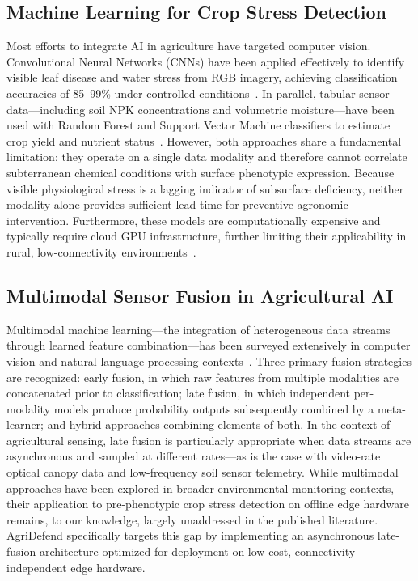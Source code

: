 \documentclass[10pt,twocolumn]{article}
\begin{document}
\subsection{Machine Learning for Crop Stress Detection}
Most efforts to integrate AI in agriculture have targeted computer vision.
Convolutional Neural Networks (CNNs) have been applied effectively to identify visible leaf disease and water stress from RGB imagery, achieving classification accuracies of 85--99\% under controlled conditions~\cite{ref14,ref9}.
In parallel, tabular sensor data---including soil NPK concentrations and volumetric moisture---have been used with Random Forest and Support Vector Machine classifiers to estimate crop yield and nutrient status~\cite{ref10}.
However, both approaches share a fundamental limitation: they operate on a single data modality and therefore cannot correlate subterranean chemical conditions with surface phenotypic expression.
Because visible physiological stress is a lagging indicator of subsurface deficiency, neither modality alone provides sufficient lead time for preventive agronomic intervention.
Furthermore, these models are computationally expensive and typically require cloud GPU infrastructure, further limiting their applicability in rural, low-connectivity environments~\cite{ref13}.

\subsection{Multimodal Sensor Fusion in Agricultural AI}
Multimodal machine learning---the integration of heterogeneous data streams through learned feature combination---has been surveyed extensively in computer vision and natural language processing contexts~\cite{ref2}.
Three primary fusion strategies are recognized: early fusion, in which raw features from multiple modalities are concatenated prior to classification; late fusion, in which independent per-modality models produce probability outputs subsequently combined by a meta-learner; and hybrid approaches combining elements of both.
In the context of agricultural sensing, late fusion is particularly appropriate when data streams are asynchronous and sampled at different rates---as is the case with video-rate optical canopy data and low-frequency soil sensor telemetry.
While multimodal approaches have been explored in broader environmental monitoring contexts, their application to pre-phenotypic crop stress detection on offline edge hardware remains, to our knowledge, largely unaddressed in the published literature.
AgriDefend specifically targets this gap by implementing an asynchronous late-fusion architecture optimized for deployment on low-cost, connectivity-independent edge hardware.
\end{document}
